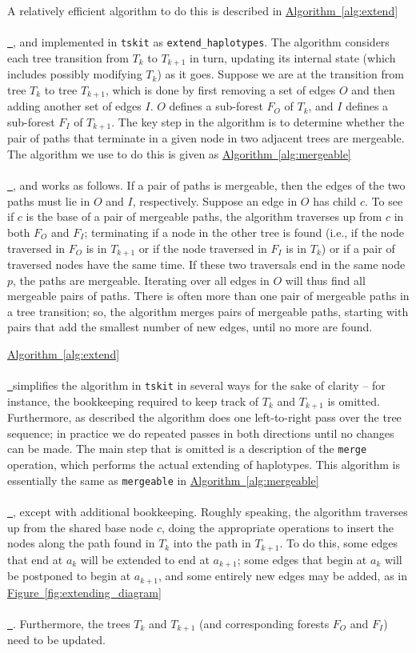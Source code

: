 \documentclass[10pt,twoside,lineno]{gsajnl}
\newcommand{\tskit}{\texttt{tskit}}
\newcommand{\algorithmref}[2][]{%
	\hyperref[{#2}]{%
		Algorithm~\ref*{#2}%
		\ifx\\#1\\%
		\else
		\,#1%
		\fi
	}%
}
\newcommand*{\figref}[2][]{%
	\hyperref[{#2}]{%
		Figure~\ref*{#2}%
		\ifx\\#1\\%
		\else
		\,#1%
		\fi
	}%
}
\begin{document}
A relatively efficient algorithm to do this is described in \algorithmref{alg:extend}, 
and implemented in \tskit{} as \texttt{extend\_haplotypes}.
The algorithm considers each tree transition from $T_k$ to $T_{k+1}$ in turn, updating its internal state
(which includes possibly modifying $T_k$) as it goes.
Suppose we are at the transition from tree $T_k$ to tree $T_{k+1}$,
which is done by first removing a set of edges $O$
and then adding another set of edges $I$.
$O$ defines a sub-forest $F_O$ of $T_k$,
and $I$ defines a sub-forest $F_I$ of $T_{k+1}$.
The key step in the algorithm is to determine whether the pair of paths
that terminate in a given node in two adjacent trees are mergeable.
The algorithm we use to do this is given as \algorithmref{alg:mergeable},
and works as follows.
If a pair of paths is mergeable,
then the edges of the two paths must lie in $O$ and $I$, respectively.
Suppose an edge in $O$ has child $c$.
To see if $c$ is the base of a pair of mergeable paths,
the algorithm traverses up from $c$ in both $F_O$ and $F_I$;
terminating if a node in the other tree is found
(i.e., if the node traversed in $F_O$ is in $T_{k+1}$ or if the node traversed in $F_I$ is in $T_k$)
or if a pair of traversed nodes have the same time.
If these two traversals end in the same node $p$, the paths are mergeable.
Iterating over all edges in $O$ will thus find all mergeable pairs of paths.
There is often more than one pair of mergeable paths in a tree transition;
so, the algorithm merges pairs of mergeable paths,
starting with pairs that add the smallest number of new edges,
until no more are found.


\algorithmref{alg:extend} simplifies the algorithm in \tskit{}
in several ways for the sake of clarity --
for instance, the bookkeeping required to keep track of $T_k$ and $T_{k+1}$ is omitted.
Furthermore, as described the algorithm does one left-to-right pass over the tree sequence;
in practice we do repeated passes in both directions until no changes can be made.
The main step that is omitted is a description of the \texttt{merge} operation,
which performs the actual extending of haplotypes.
This algorithm is essentially the same as \texttt{mergeable} in \algorithmref{alg:mergeable},
except with additional bookkeeping.
Roughly speaking, the algorithm
traverses up from the shared base node $c$,
doing the appropriate operations to insert the nodes along the path found in $T_k$
into the path in $T_{k+1}$.
To do this, some edges that end at $a_k$ will be extended to end at $a_{k+1}$;
some edges that begin at $a_k$ will be postponed to begin at $a_{k+1}$,
and some entirely new edges may be added, as in \figref{fig:extending_diagram}.
Furthermore, the trees $T_k$ and $T_{k+1}$ (and corresponding forests $F_O$ and $F_I$)
need to be updated.
\end{document}
